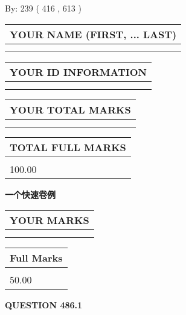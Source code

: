 \documentclass{ctexart}
\begin{document}
   
\hspace{1.0in} By: 
 239 ( 416 ,  613 )
   
   
   
   
\newpage 
\setcounter{page}{ 
   486001 } 
   
   
   
   
\noindent\begin{tabular}{|l|}
\hline
YOUR NAME (FIRST, ... LAST)  \\
\hline
 \\ 
 \\ 
\hline
\end{tabular}
\hspace{0.05in} \begin{tabular}{|l|}
\hline
 YOUR   ID   INFORMATION  \\
\hline
 \\ 
 \\ 
\hline
\end{tabular}
   
   
\vspace{0.2in}\noindent\begin{tabular}{|l|}
\hline
YOUR TOTAL MARKS  \\
\hline
 \\ 
 \\ 
\hline
\end{tabular}
\hspace{0.05in} \begin{tabular}{|l|}
\hline
TOTAL FULL MARKS  \\
\hline
 \\ 
100.00 \\
\hline
\end{tabular}
   
   
 \vspace{0.2in}
{\LARGE {\textbf{ 一个快速卷例}}}
   
   
  
\vspace{0.2in}
  
\noindent\begin{tabular}{|l|}
\hline
 YOUR MARKS  \\
\hline
 \\ 
 \\ 
\hline
\end{tabular}
\hspace{0.05in} \begin{tabular}{|l|}
\hline
 Full Marks  \\
\hline
 \\ 
50.00 \\
\hline
\end{tabular}
{\textbf{\Large{QUESTION
486.1 
}}}
  
\end{document}
